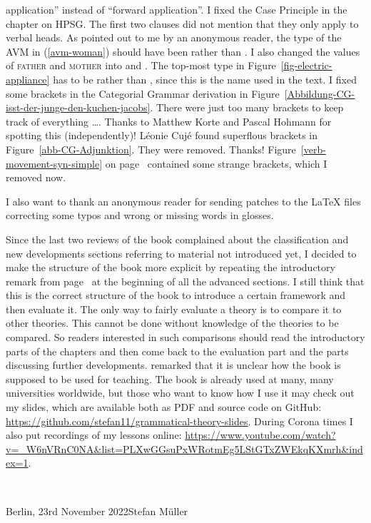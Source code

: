 application'' instead of ``forward application''.
I fixed the Case Principle in the chapter on HPSG. The first two clauses did not mention that they
only apply to verbal heads.
%
As pointed out to me by an anonymous reader, the type of the AVM in (\ref{avm-woman}) should have
been  rather than . I also changed the values of \textsc{father} and \textsc{mother}
into  and . The top-most type in Figure~\ref{fig-electric-appliance} has to be
 rather than , since this is the name used in the
text.
%
I fixed some brackets in the Categorial Grammar derivation in Figure~\ref{Abbildung-CG-isst-der-junge-den-kuchen-jacobs}. There were
just too many brackets to keep track of everything \ldots. Thanks to Matthew Korte and Pascal
Hohmann for spotting this (independently)!
Léonie Cujé found superflous brackets in Figure~\ref{abb-CG-Adjunktion}. They were removed. Thanks!
%
Figure~\ref{verb-movement-syn-simple} on page~\pageref{verb-movement-syn-simple} contained some strange brackets, which I removed now.

I also want to thank an anonymous reader for sending patches to the \LaTeX{} files correcting some
typos and wrong or missing words in glosses.

Since the last two reviews of the book complained about the classification and new developments
sections referring to material not introduced yet, I decided to make the structure of the book more
explicit by repeating the introductory remark from page~\pageref{page:structure-of-book} at the
beginning of all the advanced sections. I still think that this is the correct structure of the book to introduce a
certain framework and then evaluate it. The only way to fairly evaluate a theory is to compare it to
other theories. This cannot be done without knowledge of the theories to be compared. So readers
interested in such comparisons should read the introductory parts of the chapters and then come back
to the evaluation part and the parts discussing further developments. \citet{Culicover2021a}
remarked that it is unclear how the book is supposed to be used for teaching. The book is already
used at many, many universities worldwide, but those who want to know how I use it may check out my
slides, which are available both as PDF and source code on GitHub:
\url{https://github.com/stefan11/grammatical-theory-slides}. During Corona times I also put
recordings of my lessons online: \url{https://www.youtube.com/watch?v=_W6nVRnC0NA&list=PLXwGGsuPxWRotmEg5LStGTxZWEkqKXmrh&index=1}.

~\medskip

\noindent
Berlin, 23rd November 2022\hfill Stefan Müller




